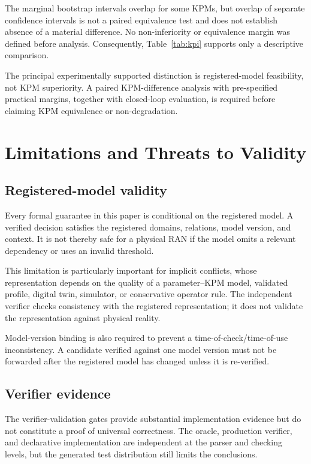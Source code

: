 \documentclass[pdflatex,sn-mathphys-num,iicol,oneside]{sn-jnl}
\begin{document}
The marginal bootstrap intervals overlap for some KPMs, but overlap
of separate confidence intervals is not a paired equivalence test and
does not establish absence of a material difference. No
non-inferiority or equivalence margin was defined before analysis.
Consequently, Table~\ref{tab:kpi} supports only a descriptive
comparison.

The principal experimentally supported distinction is registered-model
feasibility, not KPM superiority. A paired KPM-difference analysis
with pre-specified practical margins, together with closed-loop
evaluation, is required before claiming KPM equivalence or
non-degradation.

\section{Limitations and Threats to Validity}
\label{sec:limitations}

\subsection{Registered-model validity}

Every formal guarantee in this paper is conditional on the registered
model. A verified decision satisfies the registered domains,
relations, model version, and context. It is not thereby safe for a
physical RAN if the model omits a relevant dependency or uses an
invalid threshold.

This limitation is particularly important for implicit conflicts,
whose representation depends on the quality of a parameter--KPM
model, validated profile, digital twin, simulator, or conservative
operator rule. The independent verifier checks consistency with the
registered representation; it does not validate the representation
against physical reality.

Model-version binding is also required to prevent a
time-of-check/time-of-use inconsistency. A candidate verified against
one model version must not be forwarded after the registered model
has changed unless it is re-verified.

\subsection{Verifier evidence}

The verifier-validation gates provide substantial implementation
evidence but do not constitute a proof of universal correctness. The
oracle, production verifier, and declarative implementation are
independent at the parser and checking levels, but the generated test
distribution still limits the conclusions.
\end{document}
